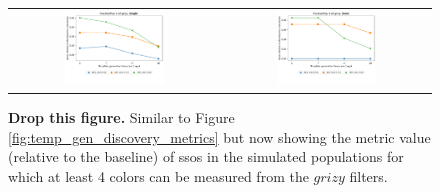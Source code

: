 \documentclass[preprintm,linenumbers]{aastex631}
\begin{document}
		\begin{figure}
			\centering
			\begin{tabular}{c c}
				\includegraphics[width=0.5\textwidth]{results/one_snap_v4_0_n_visits_4_colour_metric_bright.pdf} &
				\includegraphics[width=0.5\textwidth]{results/one_snap_v4_0_n_visits_4_colour_metric_faint.pdf}
			\end{tabular}
			\caption{\textbf{Drop this figure. }Similar to Figure \ref{fig:temp_gen_discovery_metrics} but now showing the metric value (relative to the baseline) of \glspl*{sso} in the simulated populations for which at least 4 colors can be measured from the $grizy$ filters.
			}
			\label{fig:temp_gen_colour_metrics}
		\end{figure}
		
\end{document}
